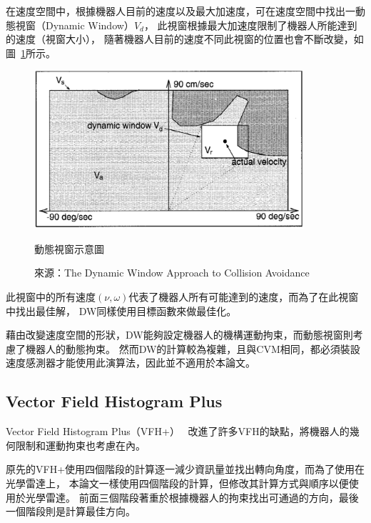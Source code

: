 在速度空間中，根據機器人目前的速度以及最大加速度，可在速度空間中找出一動態視窗（Dynamic Window）$V_d$，
此視窗根據最大加速度限制了機器人所能達到的速度（視窗大小），
隨著機器人目前的速度不同此視窗的位置也會不斷改變，如圖~\ref{f:dynamic_window}所示。
\begin{figure}[h!]
	\centering
	\includegraphics[width=10cm]{figures/dynamic_window}
	\caption{動態視窗示意圖}
	\caption*{來源：The Dynamic Window Approach to Collision Avoidance}
	\label{f:dynamic_window}
\end{figure}
此視窗中的所有速度$(\nu,\omega)$代表了機器人所有可能達到的速度，而為了在此視窗中找出最佳解，
DW同樣使用目標函數來做最佳化。

藉由改變速度空間的形狀，DW能夠設定機器人的機構運動拘束，而動態視窗則考慮了機器人的動態拘束。
然而DW的計算較為複雜，且與CVM相同，都必須裝設速度感測器才能使用此演算法，因此並不適用於本論文。

\subsection{Vector Field Histogram Plus}
Vector Field Histogram Plus（VFH+）~\cite{Ulrich:1998:VFHPlus}
改進了許多VFH的缺點，將機器人的幾何限制和運動拘束也考慮在內。

原先的VFH+使用四個階段的計算逐一減少資訊量並找出轉向角度，而為了使用在光學雷達上，
本論文一樣使用四個階段的計算，但修改其計算方式與順序以便使用於光學雷達。
前面三個階段著重於根據機器人的拘束找出可通過的方向，最後一個階段則是計算最佳方向。

